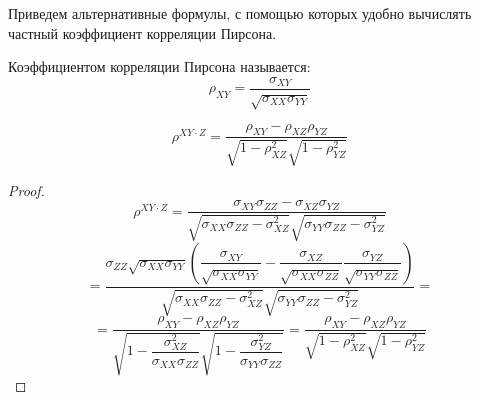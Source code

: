 Приведем альтернативные формулы, с помощью которых удобно вычислять частный коэффициент корреляции Пирсона.

\begin{definition}
    Коэффициентом корреляции Пирсона называется:
    $$
    \rho_{XY}=\dfrac{\sigma_{XY}}{\sqrt{\sigma_{XX}\sigma_{YY}}}
    $$
\end{definition}

\begin{lemma}
    $$
    \rho^{XY \cdot Z}=\dfrac{\rho_{XY}-\rho_{XZ}\rho_{YZ}}{\sqrt{1-\rho_{XZ}^2}\sqrt{1-\rho_{YZ}^2}}
    $$
\end{lemma}
\begin{proof}
    $$
    \rho^{XY \cdot Z}=\dfrac{\sigma_{XY} \sigma_{ZZ} - \sigma_{XZ} \sigma_{YZ}}{\sqrt{\sigma_{XX}\sigma_{ZZ}-
    \sigma_{XZ}^2}\sqrt{\sigma_{YY}\sigma_{ZZ}-\sigma_{YZ}^2}}
    $$
    $$
    =\dfrac{\sigma_{ZZ}\sqrt{\sigma_{XX}\sigma_{YY}}
    \left(\dfrac{\sigma_{XY}}{\sqrt{\sigma_{XX}\sigma_{YY}}} 
    - \dfrac{\sigma_{XZ}}{\sqrt{\sigma_{XX}\sigma_{ZZ}}} \dfrac{\sigma_{YZ}}{\sqrt{\sigma_{YY}\sigma_{ZZ}}}\right)}
    {\sqrt{\sigma_{XX}\sigma_{ZZ}-
    \sigma_{XZ}^2}\sqrt{\sigma_{YY}\sigma_{ZZ}-\sigma_{YZ}^2}}=
    $$
    $$
    =\dfrac{\rho_{XY}-\rho_{XZ}\rho_{YZ}}{\sqrt{1-\dfrac{\sigma_{XZ}^2}{\sigma_{XX}\sigma_{ZZ}}}
    \sqrt{1-\dfrac{\sigma_{YZ}^2}{\sigma_{YY}\sigma_{ZZ}}}}
    =\dfrac{\rho_{XY}-\rho_{XZ}\rho_{YZ}}{\sqrt{1-\rho_{XZ}^2}\sqrt{1-\rho_{YZ}^2}}
    $$
\end{proof}

